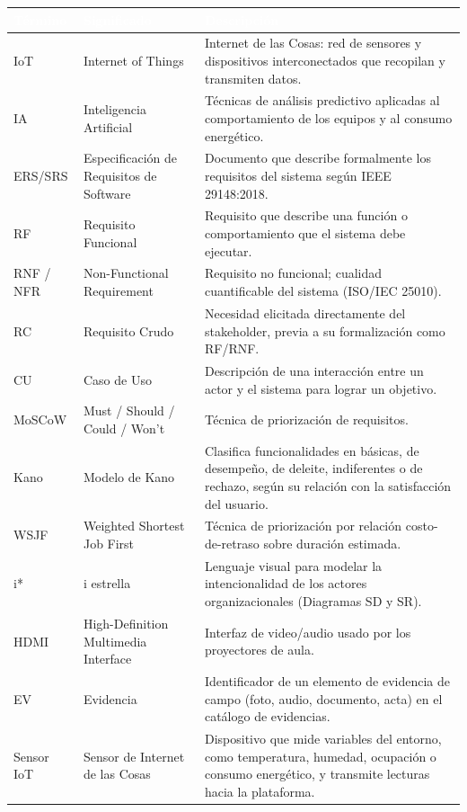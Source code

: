 \begingroup
\small
\begin{longtable}{|P{0.3333}|P{0.3333}|P{0.3333}|}
\hline
{}\textcolor{white}{\textbf{Término}} & \textcolor{white}{\textbf{Significado}} & \textcolor{white}{\textbf{Descripción}} \\ \hline
IoT & Internet of Things & Internet de las Cosas: red de sensores y dispositivos interconectados que recopilan y transmiten datos. \\ \hline
IA & Inteligencia Artificial & Técnicas de análisis predictivo aplicadas al comportamiento de los equipos y al consumo energético. \\ \hline
ERS/SRS & Especificación de Requisitos de Software & Documento que describe formalmente los requisitos del sistema según IEEE 29148:2018. \\ \hline
RF & Requisito Funcional & Requisito que describe una función o comportamiento que el sistema debe ejecutar. \\ \hline
RNF / NFR & Non-Functional Requirement & Requisito no funcional; cualidad cuantificable del sistema (ISO/IEC 25010). \\ \hline
RC & Requisito Crudo & Necesidad elicitada directamente del stakeholder, previa a su formalización como RF/RNF. \\ \hline
CU & Caso de Uso & Descripción de una interacción entre un actor y el sistema para lograr un objetivo. \\ \hline
MoSCoW & Must / Should / Could / Won't & Técnica de priorización de requisitos. \\ \hline
Kano & Modelo de Kano & Clasifica funcionalidades en básicas, de desempeño, de deleite, indiferentes o de rechazo, según su relación con la satisfacción del usuario. \\ \hline
WSJF & Weighted Shortest Job First & Técnica de priorización por relación costo-de-retraso sobre duración estimada. \\ \hline
i* & i estrella & Lenguaje visual para modelar la intencionalidad de los actores organizacionales (Diagramas SD y SR). \\ \hline
HDMI & High-Definition Multimedia Interface & Interfaz de video/audio usado por los proyectores de aula. \\ \hline
EV & Evidencia & Identificador de un elemento de evidencia de campo (foto, audio, documento, acta) en el catálogo de evidencias. \\ \hline
Sensor IoT & Sensor de Internet de las Cosas & Dispositivo que mide variables del entorno, como temperatura, humedad, ocupación o consumo energético, y transmite lecturas hacia la plataforma. \\ \hline

\end{longtable}
